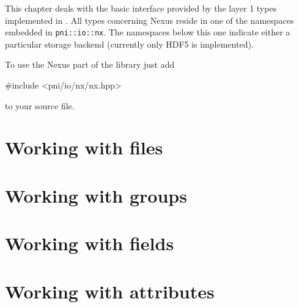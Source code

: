 
This chapter deals with the basic interface provided by the layer 1 types
implemented in \libpniio. All types concerning Nexus reside in one of the
namespaces embedded in {\tt pni::io::nx}. The namespaces below this one 
indicate either a particular storage backend (currently only HDF5 is
implemented).

To use the Nexus part of the library just add 
\begin{cppcode}
#include <pni/io/nx/nx.hpp>
\end{cppcode}
to your source file. 

\section{Working with files}



\section{Working with groups}



\section{Working with fields}



\section{Working with attributes}



